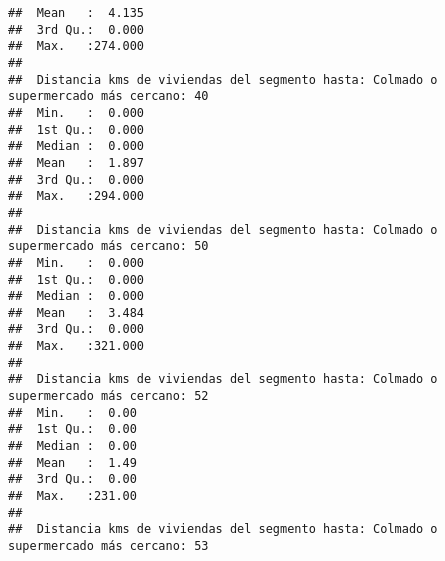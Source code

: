\documentclass[11pt,]{article}
\begin{document}
\begin{verbatim}
##  Mean   :  4.135                                                                      
##  3rd Qu.:  0.000                                                                      
##  Max.   :274.000                                                                      
##                                                                                       
##  Distancia kms de viviendas del segmento hasta: Colmado o supermercado más cercano: 40
##  Min.   :  0.000                                                                      
##  1st Qu.:  0.000                                                                      
##  Median :  0.000                                                                      
##  Mean   :  1.897                                                                      
##  3rd Qu.:  0.000                                                                      
##  Max.   :294.000                                                                      
##                                                                                       
##  Distancia kms de viviendas del segmento hasta: Colmado o supermercado más cercano: 50
##  Min.   :  0.000                                                                      
##  1st Qu.:  0.000                                                                      
##  Median :  0.000                                                                      
##  Mean   :  3.484                                                                      
##  3rd Qu.:  0.000                                                                      
##  Max.   :321.000                                                                      
##                                                                                       
##  Distancia kms de viviendas del segmento hasta: Colmado o supermercado más cercano: 52
##  Min.   :  0.00                                                                       
##  1st Qu.:  0.00                                                                       
##  Median :  0.00                                                                       
##  Mean   :  1.49                                                                       
##  3rd Qu.:  0.00                                                                       
##  Max.   :231.00                                                                       
##                                                                                       
##  Distancia kms de viviendas del segmento hasta: Colmado o supermercado más cercano: 53

\end{verbatim}
\end{document}
